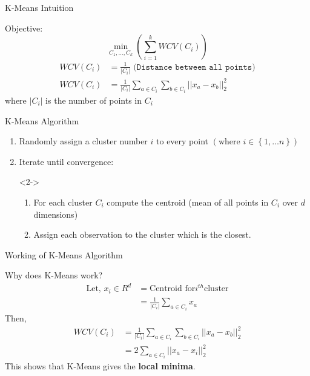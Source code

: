 \documentclass{beamer}
\begin{document}
\begin{frame}{K-Means Intuition}

Objective: $$ \min_{C_1,\ldots , C_k} \left( \sum_{i=1}^{k} WCV \left(C_i\right) \right) $$
\pause
\begin{align*}
WCV\left(C_i\right) &= \frac{1}{|C_i|}\texttt{ (Distance between all points)} \\
 WCV\left(C_i\right) &= \frac{1}{|C_i|}\sum_{a\in C_i}\sum_{b\in C_i}|| x_a - x_b ||_2^2
\end{align*}
where $|C_i|$ is the number of points in $C_i$
\end{frame}

\begin{frame}{K-Means Algorithm}
\begin{enumerate}
\item<1-> Randomly assign a cluster number $i$ to every point $\left(\text{where } i\in\left\lbrace 1, \ldots n \right\rbrace \right)$
\item<4-> Iterate until convergence:
\item[]<2-> \begin{enumerate}
\item<2-> For each cluster $C_i$ compute the centroid (mean of all points in $C_i$ over $d$ dimensions)
\item<3-> Assign each observation to the cluster which is the closest.
\end{enumerate}
\end{enumerate}
\end{frame}

\begin{frame}{Working of K-Means Algorithm}

\end{frame}
	
\begin{frame}{Why does K-Means work?}
\begin{align*}
\text{Let, } x_i\in R^d &= \text{Centroid for} i^{th} \text{cluster} \\
&= \frac{1}{|C_i|}\sum_{a\in C_i} x_a
\end{align*}
\pause
Then,
\begin{align*}
WCV\left(C_i\right) &= \frac{1}{|C_i|}\sum_{a\in C_i}\sum_{b\in C_i}|| x_a - x_b ||_2^2 \\
&= 2\sum_{a\in C_i} ||x_a - x_i||_2^2
\end{align*}
\pause
This shows that K-Means gives the \textbf{local minima}.
\end{frame}
\end{document}
